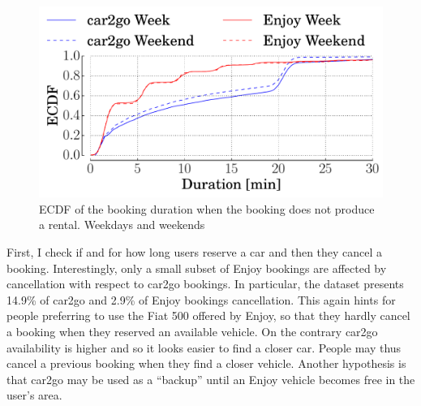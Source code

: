 \begin{figure}
	\centering
	\includegraphics[width=0.85\columnwidth]{figures/no_rent.pdf}
	\caption{ECDF of the booking duration when the booking does not produce a rental. Weekdays and weekends \label{fig:3_5_pdf_norent}}
\end{figure}

First, I check if and for how long users reserve a car and then they cancel a booking. Interestingly, only a small subset of Enjoy bookings are affected by cancellation with respect to car2go bookings. In particular, the dataset presents 14.9\% of car2go and 2.9\% of Enjoy bookings cancellation. This again hints for people preferring to use the Fiat 500 offered by Enjoy, so that they hardly cancel a booking when they reserved an available vehicle. On the contrary car2go availability is higher and so it looks easier to find a closer car. People may thus cancel a previous booking when they find a closer vehicle. Another hypothesis is that car2go may be used as a ``backup'' until an Enjoy vehicle becomes free in the user's area. 

